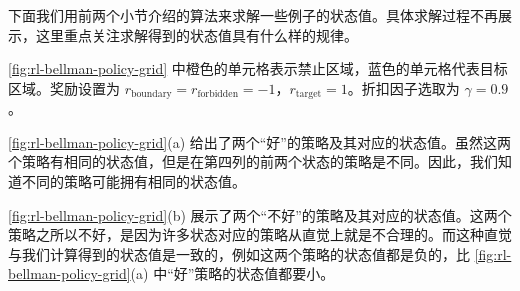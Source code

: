下面我们用前两个小节介绍的算法来求解一些例子的状态值。具体求解过程不再展示，这里重点关注求解得到的状态值具有什么样的规律。

\cref{fig:rl-bellman-policy-grid} 中橙色的单元格表示禁止区域，蓝色的单元格代表目标区域。奖励设置为 $r_{\mathrm{boundary}} = r_{\mathrm{forbidden}} = -1$，$r_{\mathrm{target}} = 1$。折扣因子选取为 $\gamma = 0.9$。

\cref{fig:rl-bellman-policy-grid}(a) 给出了两个“好”的策略及其对应的状态值。虽然这两个策略有相同的状态值，但是在第四列的前两个状态的策略是不同。因此，我们知道不同的策略可能拥有相同的状态值。

\cref{fig:rl-bellman-policy-grid}(b) 展示了两个“不好”的策略及其对应的状态值。这两个策略之所以不好，是因为许多状态对应的策略从直觉上就是不合理的。而这种直觉与我们计算得到的状态值是一致的，例如这两个策略的状态值都是负的，比 \cref{fig:rl-bellman-policy-grid}(a) 中“好”策略的状态值都要小。

